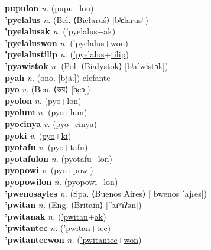 \textbf{pupulon} \textit{n.} (\hyperref[pupu]{pupu}+\hyperref[lon]{lon})
 \label{pupulon} \\
\textbf{'pyelalus} \textit{n.} (Bel. ⟨Biełaruś⟩ [bʲɛlarusʲ])
 \label{'pyelalus} \\
\textbf{'pyelalusak} \textit{n.} (\hyperref['pyelalus]{'pyelalus}+\hyperref[ak]{ak})
 \label{'pyelalusak} \\
\textbf{'pyelaluswon} \textit{n.} (\hyperref['pyelalus]{'pyelalus}+\hyperref[won]{won})
 \label{'pyelaluswon} \\
\textbf{'pyelalustilip} \textit{n.} (\hyperref['pyelalus]{'pyelalus}+\hyperref[tilip]{tilip})
 \label{'pyelalustilip} \\
\textbf{'pyawistok} \textit{n.} (Pol. ⟨Białystok⟩ [bʲaˈwɨstɔk])
 \label{'pyawistok} \\
\textbf{pyah} \textit{n.} (ono. [bjãː])
elefante \label{pyah} \\
\textbf{pyo} \textit{v.} (Ben. ⟨ভয়⟩ [b̤e̯ɔ])
 \label{pyo} \\
\textbf{pyolon} \textit{n.} (\hyperref[pyo]{pyo}+\hyperref[lon]{lon})
 \label{pyolon} \\
\textbf{pyolum} \textit{n.} (\hyperref[pyo]{pyo}+\hyperref[lum]{lum})
 \label{pyolum} \\
\textbf{pyocinya} \textit{v.} (\hyperref[pyo]{pyo}+\hyperref[cinya]{cinya})
 \label{pyocinya} \\
\textbf{pyoki} \textit{v.} (\hyperref[pyo]{pyo}+\hyperref[ki]{ki})
 \label{pyoki} \\
\textbf{pyotafu} \textit{v.} (\hyperref[pyo]{pyo}+\hyperref[tafu]{tafu})
 \label{pyotafu} \\
\textbf{pyotafulon} \textit{n.} (\hyperref[pyotafu]{pyotafu}+\hyperref[lon]{lon})
 \label{pyotafulon} \\
\textbf{pyopowi} \textit{v.} (\hyperref[pyo]{pyo}+\hyperref[powi]{powi})
 \label{pyopowi} \\
\textbf{pyopowilon} \textit{n.} (\hyperref[pyopowi]{pyopowi}+\hyperref[lon]{lon})
 \label{pyopowilon} \\
\textbf{'pwenosayles} \textit{n.} (Spa. ⟨Buenos Aires⟩ [ˈbwenos ˈajɾes])
 \label{'pwenosayles} \\
\textbf{'pwitan} \textit{n.} (Eng. ⟨Britain⟩ [ˈbɹʷɪʔən])
 \label{'pwitan} \\
\textbf{'pwitanak} \textit{n.} (\hyperref['pwitan]{'pwitan}+\hyperref[ak]{ak})
 \label{'pwitanak} \\
\textbf{'pwitantec} \textit{n.} (\hyperref['pwitan]{'pwitan}+\hyperref[tec]{tec})
 \label{'pwitantec} \\
\textbf{'pwitantecwon} \textit{n.} (\hyperref['pwitantec]{'pwitantec}+\hyperref[won]{won})
 \label{'pwitantecwon} \\

